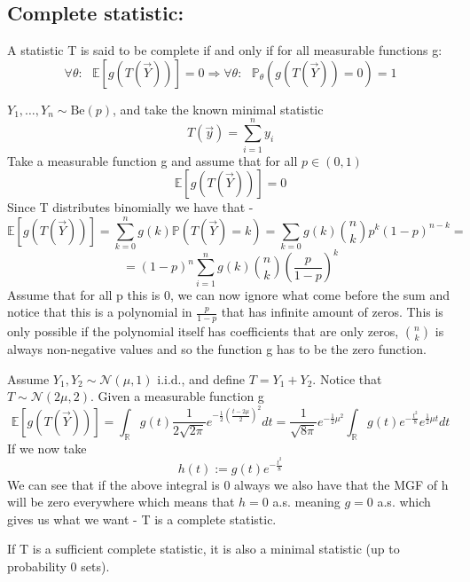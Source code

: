 \documentclass[../main.tex]{subfiles}
\begin{document}
\subsection{Complete statistic:}
\begin{definition}
A statistic T is said to be complete if and only if for all measurable functions g:
\[\forall\theta:\text{ } \mathbb{E}\left[g(T(\overrightarrow{Y}))\right]=0\Longrightarrow\forall\theta: \text{ }\mathbb{P}_\theta\left(g(T(\overrightarrow{Y}))=0\right)=1\] \end{definition}
\begin{example} $Y_1,\dots,Y_n\sim\text{Be}(p)$, and take the known minimal statistic \[T(\overrightarrow{y}) = \sum_{i=1}^n y_i\]
Take a measurable function g and assume that for all $p\in(0,1)$
\[\mathbb{E}\left[g(T(\overrightarrow{Y}))\right] = 0\]
Since T distributes binomially we have that - 
\[\mathbb{E}\left[g(T(\overrightarrow{Y}))\right] = \sum_{k=0}^n g(k) \mathbb{P}\left(T(\overrightarrow{Y})=k\right) = \sum_{k=0} g(k)\binom{n}{k} p^k (1-p)^{n-k} =\]\[= (1-p)^n\sum_{i=1}^n g(k)\binom{n}{k} \left(\frac{p}{1-p}\right)^k\]
Assume that for all p this is 0, we can now ignore what come before the sum and notice that this is a polynomial in $\frac{p}{1-p}$ that has infinite amount of zeros. This is only possible if the polynomial itself has coefficients that are only zeros, $\binom{n}{k}$ is always non-negative values and so the function g has to be the zero function. \end{example}
\begin{example} Assume $Y_1, Y_2\sim\mathcal{N}(\mu, 1)$ i.i.d., and define $T = Y_1 + Y_2$. Notice that $T\sim\mathcal{N}(2\mu, 2)$. Given a measurable function g \[\mathbb{E}\left[g(T(\overrightarrow{Y}))\right] = \int_{\mathbb{R}} g(t) \frac{1}{2\sqrt{2\pi}} e^{-\frac{1}{2}(\frac{t-2\mu}{2})^2}dt = \frac{1}{\sqrt{8\pi}} e^{-\frac{1}{2} \mu^2}\int_{\mathbb{R}} g(t) e^{-\frac{t^2}{8}} e^{\frac{1}{2}\mu t} dt\]
If we now take \[h(t):=g(t) e^{-\frac{t^2}{8}}\]
We can see that if the above integral is 0 always we also have that the MGF of h will be zero everywhere which means that $h=0$ a.s. meaning $g=0$ a.s. which gives us what we want - T is a complete statistic. \end{example}
\newpage
\begin{theorem} If T is a sufficient complete statistic, it is also a minimal statistic (up to probability 0 sets). \end{theorem}
\end{document}
